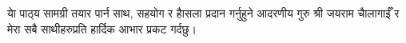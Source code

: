 \begin{titlepage}
\newpage
\vspace*{\fill}
\thispagestyle{empty}

\newpage
\vspace*{\fill}
\thispagestyle{empty}
\begin{center}
	\begin{nepali}
		{\large {याे पाठ्‍य सामग्री तयार पार्न साथ, सहयोग र हाैसला प्रदान गर्नुहुने आदरणीय गुरु श्री जयराम चाैलागाईँ र मेरा सबै साथीहरुप्रति हार्दिक आभार प्रकट गर्दछु।}}
	\end{nepali}
\end{center}
\vspace*{\fill}



\end{titlepage}